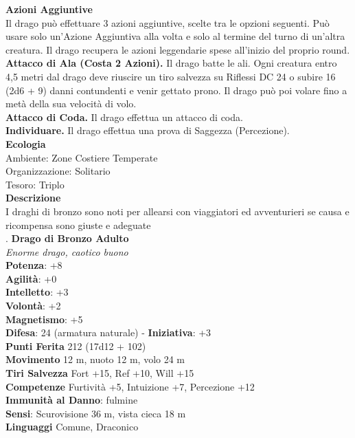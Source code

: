 \begin{multicols}{2}
\textbf{Azioni Aggiuntive}\\
Il drago può effettuare 3 azioni aggiuntive, scelte tra le opzioni seguenti. Può usare solo un'Azione Aggiuntiva alla volta e solo al termine del turno di un'altra creatura. Il drago recupera le azioni leggendarie spese all'inizio del proprio round.\\
\textbf{Attacco di Ala (Costa 2 Azioni).} Il drago batte le ali. Ogni creatura entro 4,5 metri dal drago deve riuscire un tiro salvezza su Riflessi DC 24 o subire 16 (2d6 + 9) danni contundenti e venir gettato prono. Il drago può poi volare fino a metà della sua velocità di volo.\\
\textbf{Attacco di Coda.} Il drago effettua un attacco di coda.\\
\textbf{Individuare.} Il drago effettua una prova di Saggezza (Percezione).\\
\textbf{Ecologia}\\
Ambiente: Zone Costiere Temperate\\
Organizzazione: Solitario\\
Tesoro: Triplo\\
\textbf{Descrizione}\\
I draghi di bronzo sono noti per allearsi con viaggiatori ed avventurieri se causa e ricompensa sono giuste e adeguate\\
.
\medskip\textbf{Drago di Bronzo Adulto}\\
\emph{Enorme drago, caotico buono}\\
\textbf{Potenza}: +8\\
\textbf{Agilità}: +0\\
\textbf{Intelletto}: +3\\
\textbf{Volontà}: +2\\
\textbf{Magnetismo}: +5\\
\textbf{Difesa}: 24 (armatura naturale) - \textbf{Iniziativa}: +3\\
\textbf{Punti Ferita} 212 (17d12 + 102)\\
\textbf{Movimento} 12 m, nuoto 12 m, volo 24 m\\
\textbf{Tiri Salvezza} Fort +15, Ref +10, Will +15\\
\textbf{Competenze} Furtività +5, Intuizione +7, Percezione +12\\
\textbf{Immunità al Danno}: fulmine\\
\textbf{Sensi}: Scurovisione 36 m, vista cieca 18 m\\
\textbf{Linguaggi} Comune, Draconico\\

\end{multicols}
